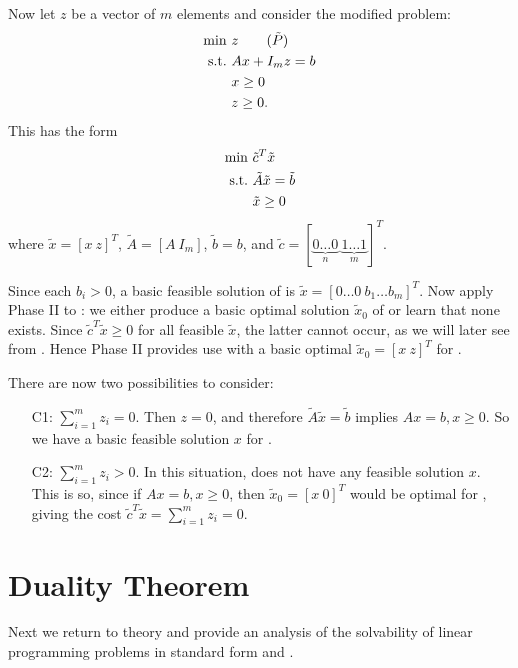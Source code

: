 Now let $z$ be a vector of $m$ elements and consider the modified problem:
\begin{align}
\min \ & z \tag{$\tilde{P}$} \labeq{LP_tildeP} \\
\st    & Ax + I_m z = b \nonumber \\
       & x \ge 0 \nonumber \\
       & z \ge 0. \nonumber
\end{align}
This has the form
\begin{align*}
\min \ & \tilde{c}^T \tilde{x} \\
\mathrm{s.t. \ }    & \tilde{A} \tilde{x} = \tilde{b} \\
       & \tilde{x} \ge 0
\end{align*}
where $\tilde{x} = [x \ z]^T$, $\tilde{A} = [A \ I_m]$, $\tilde{b} = b$, and $\tilde{c} = [\underbrace{0 \dots 0}_{n} \ \underbrace{1 \dots 1}_{m}]^T$.

Since each $b_i > 0$, a basic feasible solution of  is $\tilde{x} = [0 \dots 0 \ b_1 \dots b_m]^T$.
Now apply Phase II to : we either produce a basic optimal solution $\tilde{x}_0$ of  or learn that none exists.
Since $\tilde{c}^T \tilde{x} \geq 0$ for all feasible $\tilde{x}$, the latter cannot occur, as we will later see from .
Hence Phase II provides use with a basic optimal $\tilde{x}_0 = [x \ z]^T$ for .

There are now two possibilities to consider:
\begin{enumerate}
    \item[C1:] $\sum_{i=1}^{m} z_i = 0$.
    Then $z = 0$, and therefore $\tilde{A} \tilde{x} = \tilde{b}$ implies $Ax = b, x \ge 0$.
    So we have a basic feasible solution $x$ for .
    \item[C2:] $\sum_{i=1}^{m} z_i > 0$.
    In this situation,  does not have any feasible solution $x$.
    This is so, since if $Ax = b, x \ge 0$, then $\tilde{x}_0 = [x \ 0]^T$ would be optimal for , giving the cost $\tilde{c}^T \tilde{x} = \sum_{i=1}^{m} z_i = 0$.
\end{enumerate}

\section{Duality Theorem}

Next we return to theory and provide an analysis of the solvability of linear programming problems in standard form  and .

